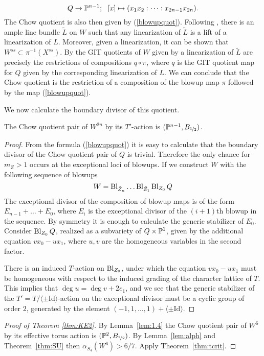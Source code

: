 \begin{equation} \label{blowupquot}
Q \to \mathbb{P}^{n-1}; \ \ [x] \mapsto (x_1x_2:\dots :x_{2n-1}x_{2n}).
\end{equation}
The Chow quotient is also then given by (\ref{blowupquot}). Following \cite{kirwan}, there is an ample line bundle \(\tilde{L}\) on \(W\) such that any linearization of \(\tilde{L}\) is a lift of a linearization of \(L\). Moreover, given a linearization, it can  be shown that \(W^{ss} \subset \pi^{-1}(X^{ss})\). By \cite[Lemma 3.11]{kirwan} the GIT quotients of \(W\) given by a linearization of \(\tilde{L}\) are precisely the restrictions of compositions \(q \circ \pi\), where \(q\) is the GIT quotient map for \(Q\) given by the corresponding linearization of \(L\). We can conclude that the Chow quotient is the restriction of a composition of the blowup map \(\pi\) followed by the map (\ref{blowupquot}).

We now calculate the boundary divisor of this quotient.
\begin{lemma}\label{lem:1.6}
The Chow quotient pair of \(W^{2n}\) by its \(T'\)-action is \((\mathbb{P}^{n-1},B_{\nicefrac{1}{2}})\).
\end{lemma}
\begin{proof}
From the formula (\ref{blowupquot}) it is easy to calculate that the boundary divisor of the Chow quotient pair of \(Q\) is trivial. Therefore the only chance for \(m_Z >1\) occurs at the exceptional loci of blowups. If we construct \(W\) with the following sequence of blowups
\[
W = \operatorname{Bl}_{\tilde{Z}_{n}} \dots \operatorname{Bl}_{\tilde{Z}_1} \operatorname{Bl}_{Z_0} Q
\]
The exceptional divisor of the composition of blowup maps is of the form \(E_{n-1} + \dots + E_0\), where \(E_i\) is the exceptional divisor of the \((i+1)\)th blowup in the sequence. By symmetry it is enough to calculate the generic stabilizer of \(E_0\). Consider \(\operatorname{Bl}_{Z_0}Q\), realized as a subvariety of \(Q \times \mathbb{P}^1 \), given by the additional equation \(vx_0 - ux_1\), where \(u,v\) are the homogeneous variables in the second factor.

There is an induced \(T\)-action on \(\operatorname{Bl}_{Z_0}\), under which the equation \(vx_0 - ux_1\) must be homogeneous with respect to the induced grading of the character lattice of \(T\). This implies that \(\deg u = \deg v + 2e_1\), and we see that the generic stabilizer of the \(T' = T/ \langle \pm \text{Id} \rangle \)-action on the exceptional divisor must be a cyclic group of order \(2\), generated by the element \((-1,1,\dots,1) + \langle \pm \text{Id} \rangle\). 
\end{proof}
\begin{proof}[Proof of Theorem \ref{thm:KE2}]
By Lemma~\ref{lem:1.4} the Chow quotient pair of \(W^6\) by its effective torus action is \((\mathbb{P}^2,B_{\nicefrac{1}{2}})\). By Lemma~\ref{lem:alph} and Theorem~\ref{thm:SU} then \(\alpha_{S_4}(W^6) > 6/7\). Apply Theorem~\ref{thm:tcrit}.
\end{proof}
